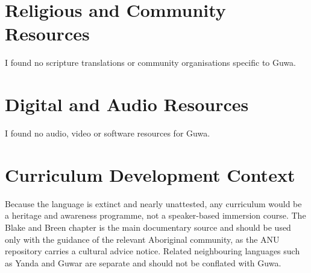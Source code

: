 \documentclass[12pt]{article}
\begin{document}
\section{Religious and Community Resources}
I found no scripture translations or community organisations specific to Guwa.

\section{Digital and Audio Resources}
I found no audio, video or software resources for Guwa.

\section{Curriculum Development Context}
Because the language is extinct and nearly unattested, any curriculum would be a heritage and awareness programme, not a speaker-based immersion course. The Blake and Breen chapter is the main documentary source and should be used only with the guidance of the relevant Aboriginal community, as the ANU repository carries a cultural advice notice. Related neighbouring languages such as Yanda and Guwar are separate and should not be conflated with Guwa.
\end{document}

